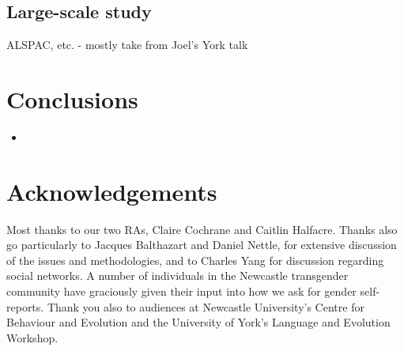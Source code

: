 \documentclass[a0,portrait]{a0poster}
\begin{document}
\begin{multicols}{2}
\subsection{Large-scale study}

ALSPAC, etc. - mostly take from Joel's York talk


\color{SaddleBrown} %

\section*{Conclusions}

\begin{itemize}
\item 
\end{itemize}

\color{DarkSlateGray} %





\section*{Acknowledgements}

Most thanks to our two RAs, Claire Cochrane and Caitlin Halfacre. Thanks also go particularly to Jacques Balthazart and Daniel Nettle, for extensive discussion of the issues and methodologies, and to Charles Yang for discussion regarding social networks. A number of individuals in the Newcastle transgender community have graciously given their input into how we ask for gender self-reports. Thank you also to audiences at Newcastle University's Centre for Behaviour and Evolution and the University of York's Language and Evolution Workshop.


\end{multicols}
\end{document}

